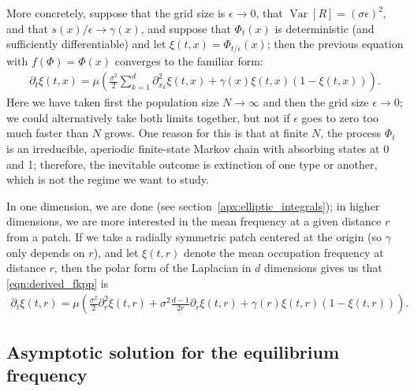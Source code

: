 \documentclass{article}
\DeclareMathOperator{\var}{Var}
\begin{document}
More concretely, suppose that the grid size is $\epsilon \to 0$, 
that $\var[R] = (\sigma \epsilon)^2$, and that $s(x)/\epsilon \to \gamma(x)$,
and suppose that $\Phi_t(x)$ is deterministic (and sufficiently differentiable) and let $\xi(t,x) = \Phi_{t/\epsilon}(x)$;
then the previous equation with $f(\Phi) = \Phi(x)$ converges to the familiar form:
\begin{align}
  \label{eqn:derived_fkpp}
  \partial_t \xi(t,x) = \mu \left( \frac{\sigma^2}{2} \sum_{k=1}^d \partial_{x_k}^2 \xi(t,x) + \gamma(x) \xi(t,x) (1-\xi(t,x)) \right) .
\end{align}
Here we have taken first the population size $N \to \infty$ and then the grid size $\epsilon \to 0$;
we could alternatively take both limits together, but not if $\epsilon$ goes to zero too much faster than $N$ grows.
One reason for this is that at finite $N$,
the process $\Phi_t$ is an irreducible, aperiodic finite-state Markov chain with absorbing states at 0 and 1;
therefore, the inevitable outcome is extinction of one type or another,
which is not the regime we want to study.

In one dimension, we are done (see section~\ref{apx:elliptic_integrals});
in higher dimensions, we are more interested in the mean frequency at a given distance $r$ from a patch.
If we take a radially symmetric patch centered at the origin (so $\gamma$ only depends on $r$), 
and let $\xi(t,r)$ denote the mean occupation frequency at distance $r$,
then the polar form of the Laplacian in $d$ dimensions gives us that \eqref{eqn:derived_fkpp} is
\begin{align}
  \label{eqn:radial_fkpp}
  \partial_t \xi(t,r) = \mu \left( \frac{\sigma^2}{2} \partial_{r}^2 \xi(t,r) + \sigma^2\frac{d-1}{2r} \partial_r \xi(t,r) + \gamma(r) \xi(t,r) (1-\xi(t,r)) \right) .
\end{align}


\subsection{Asymptotic solution for the equilibrium frequency} 
\label{apx:asymptotics}
\end{document}

